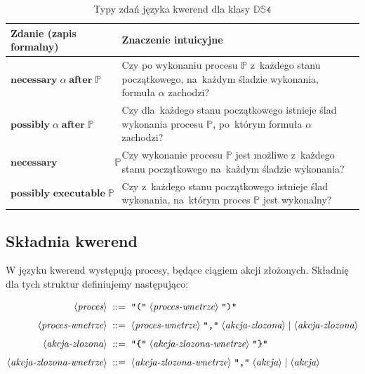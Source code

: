 \documentclass[11pt,a4paper]{article}
\newcommand{\bnfchar}[1]{\texttt{\textquotedbl#1\textquotedbl}}
\newcommand{\bnfsym}[1]{\langle \textit{#1} \rangle}
\theoremstyle{definition}
\begin{document}
\begin{table}[ht]
\centering
\caption{Typy zdań języka kwerend dla klasy $\mathbb{DS4}$}
\label{tab:ds4-query-language}
\renewcommand{\arraystretch}{1.2}
\begin{tabular}{|p{}|p{}|}
\hline
\textbf{Zdanie (zapis formalny)} & \textbf{Znaczenie intuicyjne} \\ \hline

$\textbf{necessary}\; \alpha \;\textbf{after}\; \mathbb{P}$ &
Czy po wykonaniu procesu $\mathbb{P}$ z~każdego stanu początkowego, na~każdym śladzie wykonania, formuła $\alpha$ zachodzi? \\ \hline

$\textbf{possibly}\; \alpha \;\textbf{after}\; \mathbb{P}$ &
Czy dla~każdego stanu początkowego istnieje ślad wykonania procesu $\mathbb{P}$, po~którym formuła $\alpha$ zachodzi? \\ \hline

$\textbf{necessary executable}\; \mathbb{P}$ &
Czy wykonanie procesu $\mathbb{P}$ jest możliwe z~każdego stanu początkowego na~każdym śladzie wykonania? \\ \hline

$\textbf{possibly executable}\; \mathbb{P}$ &
Czy z~każdego stanu początkowego istnieje ślad wykonania, na~którym proces $\mathbb{P}$ jest wykonalny? \\ \hline

\end{tabular}
\end{table}

\subsection{Składnia kwerend}

W języku kwerend występują procesy, będące ciągiem akcji złożonych. Składnię dla tych struktur definiujemy następująco:

\begin{align*}
    \bnfsym{proces} \;::=\;&  \; 
    \bnfchar{(} \; \bnfsym{proces-wnetrze} \; \bnfchar{)} \; \\[4pt]
    \bnfsym{proces-wnetrze} \;::=\;&  \; 
    \bnfsym{proces-wnetrze} \; \bnfchar{,} \; \bnfsym{akcja-zlozona} \; | \; \bnfsym{akcja-zlozona} \\[4pt]
    \bnfsym{akcja-zlozona} \;::=\;&  \; 
    \bnfchar{\{} \; \bnfsym{akcja-zlozona-wnetrze} \; \bnfchar{\}} \; \\[4pt]
    \bnfsym{akcja-zlozona-wnetrze} \;::=\;&  \; 
    \bnfsym{akcja-zlozona-wnetrze} \; \bnfchar{,} \; \bnfsym{akcja} \; | \; \bnfsym{akcja} \\[4pt]
\end{align*}
\end{document}
